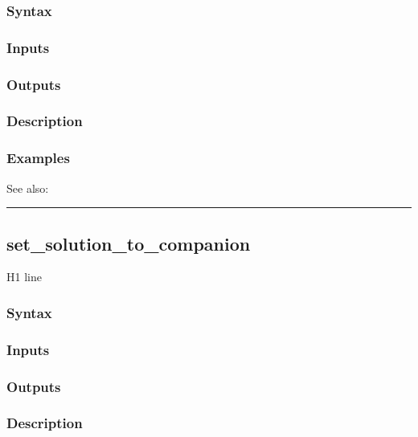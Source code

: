 \documentclass[letterpaper,10pt,english]{sphinxmanual}
\begin{document}
\subsubsection{Syntax}
\label{classes/models/@dsge/dsge:id150}

\subsubsection{Inputs}
\label{classes/models/@dsge/dsge:id151}

\subsubsection{Outputs}
\label{classes/models/@dsge/dsge:id152}

\subsubsection{Description}
\label{classes/models/@dsge/dsge:id153}

\subsubsection{Examples}
\label{classes/models/@dsge/dsge:id154}
See also:


\bigskip\hrule{}\bigskip



\subsection{set\_solution\_to\_companion}
\label{classes/models/@dsge/dsge:id155}\label{classes/models/@dsge/dsge:set-solution-to-companion}
H1 line


\subsubsection{Syntax}
\label{classes/models/@dsge/dsge:id156}

\subsubsection{Inputs}
\label{classes/models/@dsge/dsge:id157}

\subsubsection{Outputs}
\label{classes/models/@dsge/dsge:id158}

\subsubsection{Description}
\label{classes/models/@dsge/dsge:id159}
\end{document}
